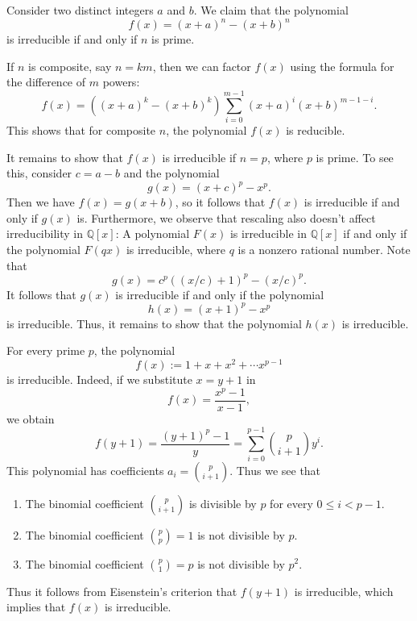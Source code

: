 \begin{example}
  Consider two distinct integers $a$ and $b$. We claim that the polynomial
  \begin{equation*}
    f(x)=(x+a)^n-(x+b)^n
  \end{equation*}
  is irreducible if and only if $n$ is prime.

  If $n$ is composite, say $n=km$, then we can factor $f(x)$ using the formula for the difference of $m$\supth{} powers:
  \begin{equation*}
    f(x)=((x+a)^k-(x+b)^k)\sum_{i=0}^{m-1}(x+a)^i(x+b)^{m-1-i}.
  \end{equation*}
  This shows that for composite $n$, the polynomial $f(x)$ is reducible.

  It remains to show that $f(x)$ is irreducible if $n=p$, where $p$ is prime. To see this, consider $c=a-b$ and the polynomial
  \begin{equation*}
    g(x)=(x+c)^p-x^p.
  \end{equation*}
  Then we have $f(x)=g(x+b)$, so it follows that $f(x)$ is irreducible if and only if $g(x)$ is. Furthermore, we observe that rescaling also doesn't affect irreducibility in $\mathbb{Q}[x]$: A polynomial $F(x)$ is irreducible in $\mathbb{Q}[x]$ if and only if the polynomial $F(qx)$ is irreducible, where $q$ is a nonzero rational number. Note that
  \begin{equation*}
    g(x)=c^p((x/c)+1)^p-(x/c)^p.
  \end{equation*}
  It follows that $g(x)$ is irreducible if and only if the polynomial
  \begin{equation*}
    h(x)=(x+1)^p-x^p
  \end{equation*}
  is irreducible. Thus, it remains to show that the polynomial $h(x)$ is irreducible.
\end{example}

\begin{example}
  For every prime $p$, the polynomial
    \begin{equation*}
      f(x):=1+x+x^2+\cdots x^{p-1}
    \end{equation*}
    is irreducible. Indeed, if we substitute $x=y+1$ in
    \begin{equation*}
      f(x)=\frac{x^p-1}{x-1},
    \end{equation*}
    we obtain
    \begin{equation*}
      f(y+1)=\frac{(y+1)^p-1}{y}=\sum_{i=0}^{p-1}\binom{p}{i+1}y^{i}.
    \end{equation*}
    This polynomial has coefficients $a_i=\binom{p}{i+1}$. Thus we see that
    \begin{enumerate}
    \item The binomial coefficient $\binom{p}{i+1}$ is divisible by $p$ for every $0\leq i<p-1$.
    \item The binomial coefficient $\binom{p}{p}=1$ is not divisible by $p$.
    \item The binomial coefficient $\binom{p}{1}=p$ is not divisible by $p^2$.
    \end{enumerate}
    Thus it follows from Eisenstein's criterion that $f(y+1)$ is irreducible, which implies that $f(x)$ is irreducible.
\end{example}

